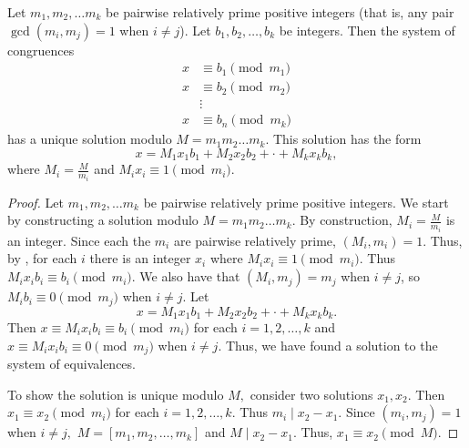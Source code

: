 \documentclass{ximera}
\begin{document}
\begin{theorem}\label{CRT}
    Let $m_1,m_2,\dots m_k$ be pairwise relatively prime positive integers (that is, any pair $\gcd(m_i,m_j)=1$ when $i\neq j$). Let $b_1, b_2,\dots, b_k$ be integers. Then the system of congruences 
   \begin{align*}
    x&\equiv b_1 \pmod{m_1}\\
    x&\equiv b_2 \pmod{m_2}\\
       &\vdots\\
     x&\equiv b_n \pmod{m_k}
   \end{align*}
   has a unique solution modulo $M=m_1m_2\dots m_k$. This solution has the form 
   \[x=M_1x_1b_1+M_2x_2b_2+\cdot+M_kx_kb_k,\] where $M_i=\frac{M}{m_i}$ and $M_i x_i\equiv 1 \pmod{m_i}$.
   
   \begin{proof} Let $m_1,m_2,\dots m_k$ be pairwise relatively prime positive integers.
    We start by constructing a solution modulo $M=m_1m_2\dots m_k$. By construction, $M_i=\frac{M}{m_i}$ is an integer. Since each the $m_i$ are pairwise relatively prime, $\left(M_i, m_i\right)=1$. Thus, by , for each $i$ there is an integer $x_i$ where $M_i x_i\equiv 1 \pmod{m_i}$. Thus $M_i x_i b_i\equiv b_i\pmod{m_i}$. We also have that $(M_i, m_j)=m_j$ when $i\neq j$, so $M_i b_i\equiv 0 \pmod{m_j}$ when $i\neq j$.  Let 
    \[x=M_1x_1b_1+M_2x_2b_2+\cdot+M_kx_kb_k.\] 
    Then $x\equiv M_i x_i b_i\equiv b_i\pmod{m_i}$ for each $i=1,2,\dots,k$ and $x\equiv M_i x_i b_i\equiv 0\pmod{m_j}$ when $i\neq j.$ Thus, we have found a solution to the system of equivalences.
    
    To show the solution is unique modulo $M,$ consider two solutions $x_1,x_2.$ Then $x_1\equiv x_2\pmod{m_i}$ for each $i=1,2,\dots,k.$ Thus $m_i\mid x_2-x_1$. Since $(m_i,m_j)=1$ when $i\neq j,$ $M=[m_1,m_2,\dots,m_k]$ and $M\mid x_2-x_1.$ Thus, $x_1\equiv x_2\pmod M.$ 
   \end{proof}
\end{theorem}  

\end{document}
